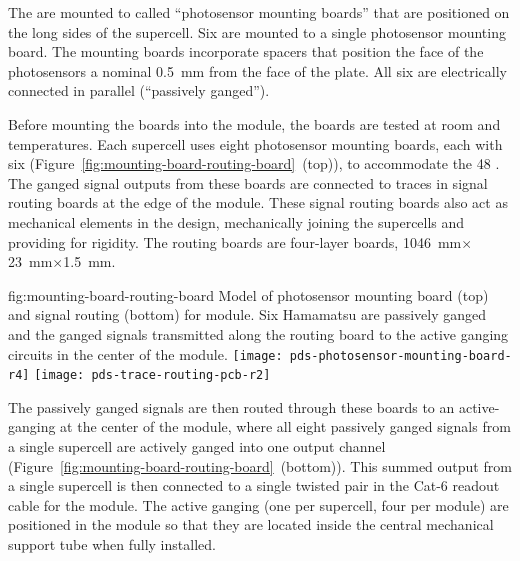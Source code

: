 The  are mounted to  called ``photosensor mounting boards'' that  are positioned on the long sides of the supercell.  
Six  are mounted to a single photosensor mounting board.  The mounting boards incorporate spacers that position the face of the photosensors a nominal \SI{0.5}{mm} from the face of the  plate.  All six are electrically connected in parallel (``passively ganged'').

 Before mounting the boards into the  module, the boards are tested at room and  temperatures. 
 Each supercell uses eight photosensor mounting boards, each with six  (Figure~\ref{fig:mounting-board-routing-board}~(top)), 
 to accommodate the 48 .  The ganged signal outputs from these boards are connected to traces in signal routing boards at the edge of the  module. These signal routing boards also act as mechanical elements in the design, mechanically joining the supercells and providing for rigidity.  The routing boards  are four-layer boards, \SI{1046}{mm}$\times$\SI{23}{mm}$\times$\SI{1.5}{mm}.

\begin{dunefigure}
 {fig:mounting-board-routing-board}
{Model of photosensor mounting board (top) and signal routing  (bottom) for  module.  Six Hamamatsu  are passively ganged and the ganged signals transmitted along the routing board to the active ganging circuits in the center of the module.}
\texttt{[image: pds-photosensor-mounting-board-r4]}
\texttt{[image: pds-trace-routing-pcb-r2]}
\end{dunefigure}
The passively ganged signals are then routed through these boards to an active-ganging  at the center of the module, where all eight passively ganged signals from a single supercell are actively ganged into one output channel (Figure~\ref{fig:mounting-board-routing-board}~(bottom)). This summed output from a single supercell is then connected to a single twisted pair in the Cat-6 readout cable for the module.  The active ganging  (one per supercell, four per module) are positioned in the module so that they are located inside the central  mechanical support tube when fully installed.


